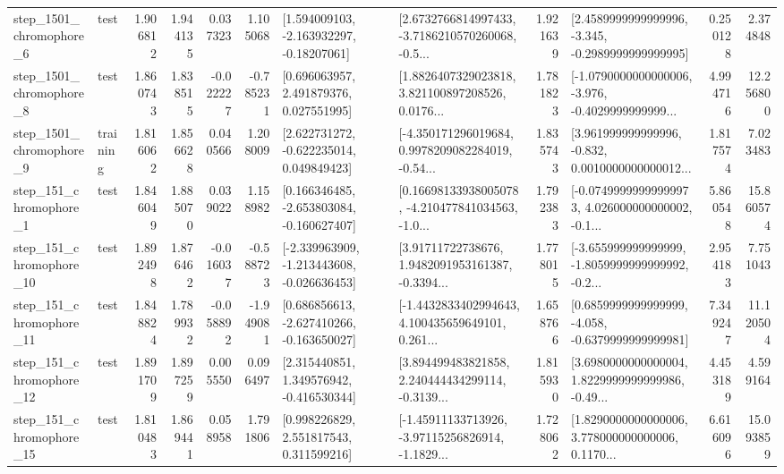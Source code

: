\begin{tabular}{llrrrrllrlrr}
  step\_1501\_chromophore\_6 &      test &      1.906812 &    1.944135 &      0.037323 &  1.105068 &    [1.594009103, -2.163932297, -0.18207061] &  [2.6732766814997433, -3.7186210570260068, -0.5... &       1.921639 &  [2.4589999999999996, -3.345, -0.2989999999999995] &            0.250128 &          2.374848 \\
  step\_1501\_chromophore\_8 &      test &      1.860743 &    1.838515 &     -0.022227 & -0.785231 &     [0.696063957, 2.491879376, 0.027551995] &  [1.8826407329023818, 3.821100897208526, 0.0176... &       1.781823 &  [-1.0790000000000006, -3.976, -0.4029999999999... &            4.994716 &         12.256800 \\
  step\_1501\_chromophore\_9 &  training &      1.816062 &    1.856628 &      0.040566 &  1.208009 &    [2.622731272, -0.622235014, 0.049849423] &  [-4.350171296019684, 0.9978209082284019, -0.54... &       1.835743 &  [3.961999999999996, -0.832, 0.0010000000000012... &            1.817574 &          7.023483 \\
   step\_151\_chromophore\_1 &      test &      1.846049 &    1.885070 &      0.039022 &  1.158982 &   [0.166346485, -2.653803084, -0.160627407] &  [0.16698133938005078, -4.210477841034563, -1.0... &       1.792383 &  [-0.07499999999999973, 4.026000000000002, -0.1... &            5.860548 &         15.860574 \\
  step\_151\_chromophore\_10 &      test &      1.892498 &    1.876462 &     -0.016037 & -0.588723 &  [-2.339963909, -1.213443608, -0.026636453] &  [3.91711722738676, 1.9482091953161387, -0.3394... &       1.778015 &  [-3.655999999999999, -1.8059999999999992, -0.2... &            2.954183 &          7.751043 \\
  step\_151\_chromophore\_11 &      test &      1.848824 &    1.789932 &     -0.058892 & -1.949081 &   [0.686856613, -2.627410266, -0.163650027] &  [-1.4432833402994643, 4.100435659649101, 0.261... &       1.658766 &  [0.6859999999999999, -4.058, -0.6379999999999981] &            7.349247 &         11.120504 \\
  step\_151\_chromophore\_12 &      test &      1.891709 &    1.897259 &      0.005550 &  0.096497 &    [2.315440851, 1.349576942, -0.416530344] &  [3.894499483821858, 2.240444434299114, -0.3139... &       1.815930 &  [3.6980000000000004, 1.8229999999999986, -0.49... &            4.453189 &          4.599164 \\
  step\_151\_chromophore\_15 &      test &      1.810483 &    1.869441 &      0.058958 &  1.791806 &     [0.998226829, 2.551817543, 0.311599216] &  [-1.45911133713926, -3.97115256826914, -1.1829... &       1.728062 &  [1.8290000000000006, 3.778000000000006, 0.1170... &            6.616096 &         15.093859 \\

\end{tabular}
